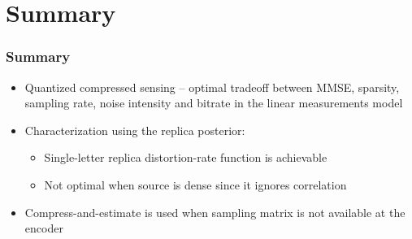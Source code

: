 \documentclass{beamer}
\begin{document}
\section{Summary}

\begin{frame}
\frametitle{Summary}
\begin{itemize}
\item Quantized compressed sensing -- optimal tradeoff between MMSE, sparsity, sampling rate, noise intensity and bitrate in the linear measurements model
\item Characterization using the replica posterior: 
\begin{itemize}
\item Single-letter replica distortion-rate function is achievable
\item Not optimal when source is dense since it ignores correlation
\end{itemize}
\item Compress-and-estimate is used when sampling matrix is not available at the encoder 
\end{itemize}

\end{frame}
\end{document}
